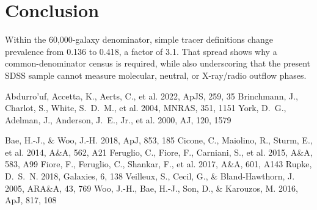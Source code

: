 \documentclass[twocolumn]{aastex631}
\begin{document}
\section{Conclusion}\label{sec:conclusion}
Within the 60,000-galaxy denominator, simple tracer definitions change prevalence from 0.136 to 0.418, a factor of 3.1. That spread shows why a common-denominator census is required, while also underscoring that the present SDSS sample cannot measure molecular, neutral, or X-ray/radio outflow phases.


\begin{thebibliography}{}
 Abdurro'uf, Accetta, K., Aerts, C., et al. 2022, ApJS, 259, 35
 Brinchmann, J., Charlot, S., White, S.~D.~M., et al. 2004, MNRAS, 351, 1151
 York, D.~G., Adelman, J., Anderson, J.~E., Jr., et al. 2000, AJ, 120, 1579

 Bae, H.-J., \& Woo, J.-H. 2018, ApJ, 853, 185
 Cicone, C., Maiolino, R., Sturm, E., et al. 2014, A\&A, 562, A21
 Feruglio, C., Fiore, F., Carniani, S., et al. 2015, A\&A, 583, A99
 Fiore, F., Feruglio, C., Shankar, F., et al. 2017, A\&A, 601, A143
 Rupke, D.~S.~N. 2018, Galaxies, 6, 138
 Veilleux, S., Cecil, G., \& Bland-Hawthorn, J. 2005, ARA\&A, 43, 769
 Woo, J.-H., Bae, H.-J., Son, D., \& Karouzos, M. 2016, ApJ, 817, 108
\end{thebibliography}
\end{document}
